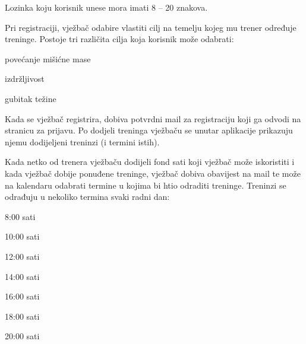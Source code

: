 		{
		Lozinka koju korisnik unese mora imati 8 – 20 znakova.\\}
		
		{Pri registraciji, vježbač odabire vlastiti cilj na temelju kojeg mu trener određuje treninge. Postoje tri različita cilja koja korisnik može odabrati:}
		
		\begin{packed_item}
            \item {povećanje mišićne mase}
            \item {izdržljivost}
            \item {gubitak težine }
        \end{packed_item}
        
        
		
		
		{Kada se vježbač registrira, dobiva potvrdni mail za registraciju koji ga odvodi na stranicu za prijavu. Po dodjeli treninga vježbaču se unutar aplikacije prikazuju njemu dodijeljeni treninzi (i termini istih).\\}
		
		
		{Kada netko od trenera vježbaču dodijeli fond sati koji vježbač može iskoristiti i kada vježbač dobije ponuđene treninge, vježbač dobiva obavijest na mail te može na kalendaru odabrati termine u kojima bi htio odraditi treninge. Treninzi se odrađuju u nekoliko termina svaki radni dan:}
		
		\begin{packed_item}
            \item {8:00 sati}
            \item {10:00 sati}
            \item {12:00 sati}
            \item {14:00 sati}
            \item {16:00 sati}
            \item {18:00 sati}
            \item {20:00 sati}

        \end{packed_item}
        
